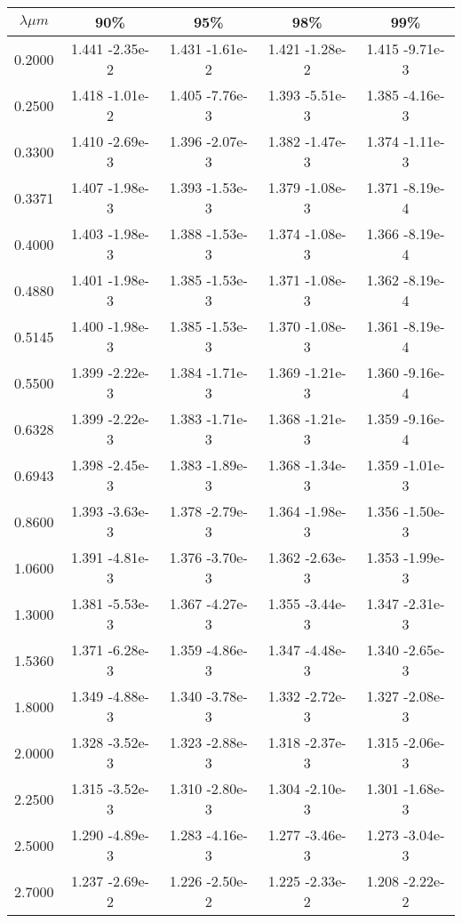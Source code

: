 \documentclass[12pt]{article}
\begin{document}
\begin{center}
\begin{table}
\begin{tabular}{| c | c | c | c | c |  }
\hline
 $\lambda \mu m$   & 90\%  & 95\%  & 98\%  & 99\% \\
\hline
0.2000 &  1.441 -2.35e-2 &    1.431 -1.61e-2  & 1.421 -1.28e-2 & 1.415 -9.71e-3 \\
0.2500  &   1.418 -1.01e-2  &  1.405 -7.76e-3  &  1.393 -5.51e-3  &  1.385 -4.16e-3 \\
0.3300  &    1.410 -2.69e-3 & 1.396 -2.07e-3   & 1.382 -1.47e-3  &  1.374 -1.11e-3 \\
0.3371   &  1.407 -1.98e-3  &  1.393 -1.53e-3  &  1.379 -1.08e-3 &   1.371 -8.19e-4 \\
0.4000   &  1.403 -1.98e-3 &   1.388 -1.53e-3  &  1.374 -1.08e-3  &  1.366 -8.19e-4 \\
0.4880  &   1.401 -1.98e-3  &  1.385 -1.53e-3  &  1.371 -1.08e-3  &  1.362 -8.19e-4 \\
0.5145  &    1.400 -1.98e-3  &  1.385 -1.53e-3  &  1.370 -1.08e-3 &   1.361 -8.19e-4 \\
0.5500  &  1.399 -2.22e-3 &   1.384 -1.71e-3  &  1.369 -1.21e-3   & 1.360 -9.16e-4 \\
0.6328   &   1.399 -2.22e-3  &  1.383 -1.71e-3  &  1.368 -1.21e-3 &   1.359 -9.16e-4 \\
0.6943  &    1.398 -2.45e-3 &   1.383 -1.89e-3  &  1.368 -1.34e-3 &   1.359 -1.01e-3 \\
0.8600   &   1.393 -3.63e-3  &  1.378 -2.79e-3  &  1.364 -1.98e-3  &  1.356 -1.50e-3 \\
1.0600     &  1.391 -4.81e-3  &  1.376 -3.70e-3 & 1.362 -2.63e-3   & 1.353 -1.99e-3  \\
1.3000   &  1.381 -5.53e-3  &  1.367 -4.27e-3 & 1.355 -3.44e-3  &  1.347 -2.31e-3 \\
1.5360  &   1.371 -6.28e-3  &  1.359 -4.86e-3  &  1.347 -4.48e-3  &  1.340 -2.65e-3 \\
1.8000  &    1.349 -4.88e-3  &  1.340 -3.78e-3  &  1.332 -2.72e-3 &   1.327 -2.08e-3 \\
2.0000   &   1.328 -3.52e-3 &   1.323 -2.88e-3  &  1.318 -2.37e-3  &  1.315 -2.06e-3 \\
2.2500   &   1.315 -3.52e-3 &   1.310 -2.80e-3  &  1.304 -2.10e-3  &  1.301 -1.68e-3 \\
2.5000  &    1.290 -4.89e-3  &  1.283 -4.16e-3  &  1.277 -3.46e-3  &  1.273 -3.04e-3 \\
2.7000  &    1.237 -2.69e-2  &  1.226 -2.50e-2  &  1.225 -2.33e-2  &  1.208 -2.22e-2 \\

\end{tabular}
\end{table}
\end{center}
\end{document}
